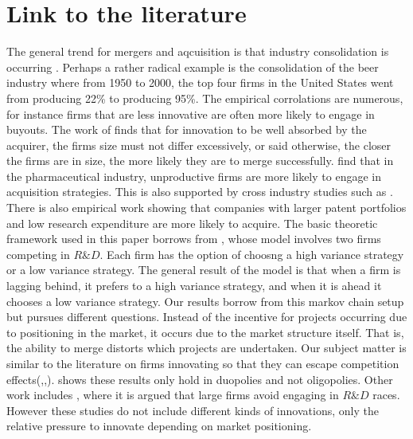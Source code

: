 \documentclass[12pt]{report}
\numberwithin{equation}{section}
\begin{document}
\section{Link to the literature}\label{literature}
The general trend for mergers and aqcuisition is that industry consolidation is occurring \citep{white2002trends}. Perhaps a rather radical example is the consolidation of the beer industry where from 1950 to 2000, the top four firms in the United States went from producing 22\% to producing 95\%. The empirical corrolations are numerous, for instance firms that are less innovative are often more likely to engage in buyouts. The work of \cite{Gerpott1995} finds that for innovation to be well absorbed by the acquirer, the firms size must not differ excessively, or said otherwise, the closer the firms are in size, the more likely they are to merge successfully. \cite{Higgins2006} find that in the pharmaceutical industry, unproductive firms are more likely to engage in acquisition strategies. This is also supported by cross industry studies such as \cite{Zhao2009}. There is also empirical work showing that companies with larger patent portfolios and low research expenditure are more likely to acquire\citep{Bena2014}. 
The basic theoretic framework used in this paper borrows from \cite{Cabral2003}, whose model involves two firms competing in $R\&D$. Each firm has the option of choosng a high variance strategy or a low variance strategy. The general result of the model is that when a firm is lagging behind, it prefers to a high variance strategy, and when it is ahead it chooses a low variance strategy. Our results borrow from this markov chain setup but pursues different questions. Instead of the incentive for projects occurring due to positioning in the market, it occurs due to the market structure itself. That is, the ability to merge distorts which projects are undertaken. 
Our subject matter is similar to the literature on firms innovating so that they can escape competition effects(\cite{Aghion2005},\cite{Aghion2001},\cite{Aghion1997}). \cite{Gilbert2016} shows these results only hold in duopolies and not oligopolies. Other work includes \cite{Phillips2012}, where it is argued that large firms avoid engaging in $R\&D$ races. However these studies do not include different kinds of innovations, only the relative pressure to innovate depending on market positioning. 
\end{document}
